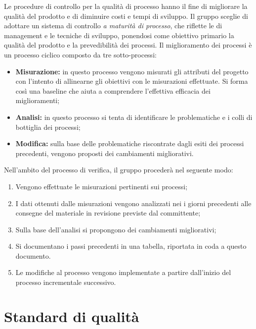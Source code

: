 \documentclass[openany,12pt,a4paper]{report}
\begin{document}
Le procedure di controllo per la qualità di processo hanno il fine di migliorare la qualità del
prodotto e di diminuire costi e tempi di sviluppo. Il gruppo sceglie di adottare un sistema di controllo \textit{a maturità di processo}, che riflette le  di management e le tecniche di
sviluppo, ponendosi come obiettivo primario la qualità del prodotto e la prevedibilità dei processi. 
Il miglioramento dei processi è un processo ciclico composto da tre sotto-processi:

\begin{itemize}
    \item \textbf{Misurazione:} in questo processo vengono misurati gli attributi del progetto con l'intento di allinearne gli obiettivi con le misurazioni effettuate. Si forma così una baseline che aiuta a comprendere l’effettiva efficacia dei miglioramenti;
    
    \item \textbf{Analisi:} in questo processo si tenta di identificare le problematiche e i colli di bottiglia dei processi;
    
    \item \textbf{Modifica:} sulla base delle problematiche riscontrate dagli esiti dei processi precedenti, vengono proposti dei cambiamenti migliorativi.
\end{itemize}

Nell'ambito del processo di verifica, il gruppo procederà nel seguente modo:

\begin{enumerate}
    \item Vengono effettuate le misurazioni pertinenti sui processi;
    \item I dati ottenuti dalle misurazioni vengono analizzati nei i giorni precedenti alle consegne del materiale in revisione previste dal committente;
    \item Sulla base dell'analisi si propongono dei cambiamenti migliorativi;
    \item Si documentano i passi precedenti in una tabella, riportata in coda a questo documento.
    \item Le modifiche al processo vengono implementate a partire dall’inizio del processo incrementale successivo. 
\end{enumerate}

\appendix


\chapter{Standard di qualità}
\end{document}
